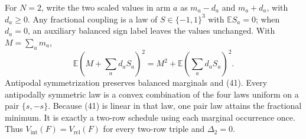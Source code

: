 For \(N=2\), write the two scaled values in arm \(a\) as \(m_a-d_a\) and \(m_a+d_a\), with \(d_a\ge0\).  Any fractional coupling is a law of \(S\in\{-1,1\}^3\) with \(\mathbb ES_a=0\); when \(d_a=0\), an auxiliary balanced sign label leaves the values unchanged.  With \(M=\sum_am_a\),
\[
 \mathbb E\left(M+\sum_ad_aS_a\right)^2
 =M^2+\mathbb E\left(\sum_ad_aS_a\right)^2. \tag{41}
\]
Antipodal symmetrization preserves balanced marginals and (41).  Every antipodally symmetric law is a convex combination of the four laws uniform on a pair \(\{s,-s\}\).  Because (41) is linear in that law, one pair law attains the fractional minimum.  It is exactly a two-row schedule using each marginal occurrence once.  Thus \(V_{\mathrm{int}}(F)=V_{\mathrm{rel}}(F)\) for every two-row triple and \(\Delta_2=0\).
